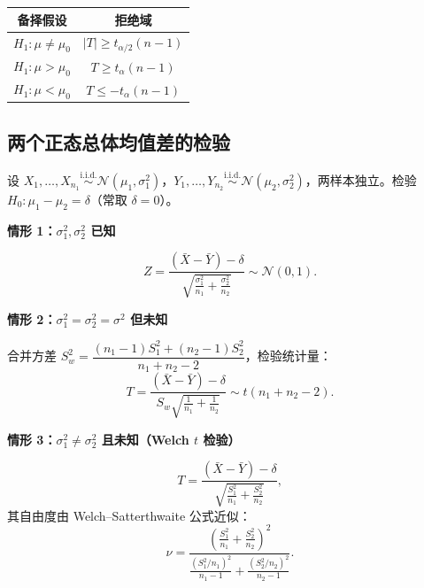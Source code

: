 \begin{center}
\begin{tabular}{c|c}
    \toprule
    备择假设 & 拒绝域 \\
    \midrule
    $H_1: \mu \neq \mu_0$ & $|T| \ge t_{\alpha/2}(n-1)$ \\
    $H_1: \mu > \mu_0$    & $T \ge t_{\alpha}(n-1)$ \\
    $H_1: \mu < \mu_0$    & $T \le -t_{\alpha}(n-1)$ \\
    \bottomrule
\end{tabular}
\end{center}

\subsection{两个正态总体均值差的检验}

设 $X_1, \dots, X_{n_1} \stackrel{\mathrm{i.i.d.}}{\sim} \mathcal{N}(\mu_1, \sigma_1^2)$，$Y_1, \dots, Y_{n_2} \stackrel{\mathrm{i.i.d.}}{\sim} \mathcal{N}(\mu_2, \sigma_2^2)$，两样本独立。检验 $H_0: \mu_1 - \mu_2 = \delta$（常取 $\delta = 0$）。

\medskip
\textbf{情形 1：$\sigma_1^2, \sigma_2^2$ 已知}

\begin{equation}
    Z = \frac{(\bar{X} - \bar{Y}) - \delta}{\sqrt{\frac{\sigma_1^2}{n_1} + \frac{\sigma_2^2}{n_2}}} \sim \mathcal{N}(0,1).
\end{equation}

\medskip
\textbf{情形 2：$\sigma_1^2 = \sigma_2^2 = \sigma^2$ 但未知}

合并方差 $S_w^2 = \dfrac{(n_1-1)S_1^2 + (n_2-1)S_2^2}{n_1 + n_2 - 2}$，检验统计量：
\begin{equation}
    T = \frac{(\bar{X} - \bar{Y}) - \delta}{S_w \sqrt{\frac{1}{n_1} + \frac{1}{n_2}}} \sim t(n_1 + n_2 - 2).
\end{equation}

\medskip
\textbf{情形 3：$\sigma_1^2 \neq \sigma_2^2$ 且未知（Welch $t$ 检验）}

\begin{equation}
    T = \frac{(\bar{X} - \bar{Y}) - \delta}{\sqrt{\frac{S_1^2}{n_1} + \frac{S_2^2}{n_2}}},
\end{equation}
其自由度由 Welch--Satterthwaite 公式近似：
\begin{equation}
    \nu = \frac{\left(\frac{S_1^2}{n_1} + \frac{S_2^2}{n_2}\right)^2}
                 {\frac{(S_1^2/n_1)^2}{n_1-1} + \frac{(S_2^2/n_2)^2}{n_2-1}}.
\end{equation}

